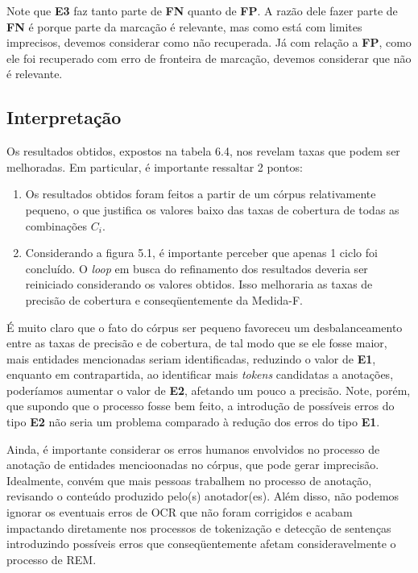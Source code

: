\documentclass[11pt]{report}
\begin{document}
Note que \textbf{E3} faz tanto parte de \textbf{FN} quanto de \textbf{FP}. A razão dele fazer parte de \textbf{FN} é porque parte da marcação é relevante, mas como está com limites imprecisos, devemos considerar como não recuperada. Já com relação a \textbf{FP}, como ele foi recuperado com erro de fronteira de marcação, devemos considerar que não é relevante.

\subsection{Interpretação}

\indent\indent Os resultados obtidos, expostos na tabela 6.4, nos revelam taxas que podem ser melhoradas. Em particular, é importante ressaltar 2 pontos:

\begin{enumerate}[label={\textbf{\arabic*.}}]
\item Os resultados obtidos foram feitos a partir de um córpus relativamente pequeno, o que justifica os valores baixo das taxas de cobertura de todas as combinações $C_i$.
\item Considerando a figura 5.1, é importante perceber que apenas 1 ciclo foi concluído. O \textit{loop} em busca do refinamento dos resultados deveria ser reiniciado considerando os
valores obtidos. Isso melhoraria as taxas de precisão de cobertura e conseqüentemente da Medida-F.
\end{enumerate}

É muito claro que o fato do córpus ser pequeno favoreceu um desbalanceamento entre as taxas de precisão e de cobertura, de tal modo que se ele fosse maior, mais entidades mencionadas
seriam identificadas, reduzindo o valor de \textbf{E1}, enquanto em contrapartida, ao identificar mais \textit{tokens} candidatas a anotações, poderíamos aumentar o valor de \textbf{E2}, afetando um pouco a precisão. Note, porém, que supondo que o processo fosse bem feito, a introdução de possíveis erros do tipo \textbf{E2} não seria um problema comparado à redução dos
erros do tipo \textbf{E1}.

Ainda, é importante considerar os erros humanos envolvidos no processo de anotação de entidades mencioonadas no córpus, que pode gerar imprecisão. Idealmente, convém que mais
pessoas trabalhem no processo de anotação, revisando o conteúdo produzido pelo(s) anotador(es). Além disso, não podemos ignorar os eventuais erros de OCR que não foram corrigidos
e acabam impactando diretamente nos processos de tokenização e detecção de sentenças introduzindo possíveis erros que conseqüentemente afetam consideravelmente o processo de REM.
\end{document}
